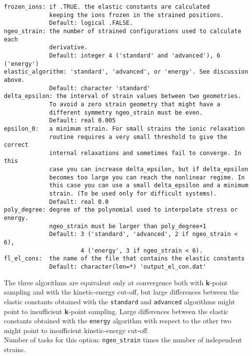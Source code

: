 \documentclass[12pt,a4paper]{article}
\begin{document}
\begin{verbatim}
frozen_ions: if .TRUE. the elastic constants are calculated 
             keeping the ions frozen in the strained positions. 
             Default: logical .FALSE.
ngeo_strain: the number of strained configurations used to calculate each
             derivative. 
             Default: integer 4 ('standard' and 'advanced'), 6 ('energy')
elastic_algorithm: 'standard', 'advanced', or 'energy'. See discussion above.
             Default: character 'standard' 
delta_epsilon: the interval of strain values between two geometries.
             To avoid a zero strain geometry that might have a
             different symmetry ngeo_strain must be even.
             Default: real 0.005
epsilon_0:   a minimum strain. For small strains the ionic relaxation 
             routine requires a very small threshold to give the correct 
             internal relaxations and sometimes fail to converge. In this 
             case you can increase delta_epsilon, but if delta_epsilon 
             becomes too large you can reach the nonlinear regime. In 
             this case you can use a small delta_epsilon and a minimum 
             strain. (To be used only for difficult systems).
             Default: real 0.0
poly_degree: degree of the polynomial used to interpolate stress or energy.
             ngeo_strain must be larger than poly_degree+1
             Default: 3 ('standard', 'advanced', 2 if ngeo_strain < 6), 
                      4 ('energy', 3 if ngeo_strain < 6).
fl_el_cons:  the name of the file that contains the elastic constants
             Default: character(len=*) 'output_el_con.dat'
\end{verbatim}
The three algorithms are equivalent only at convergence both with
{\bf k}-point sampling and with the kinetic-energy cut-off, but 
large differences between the elastic constants obtained with the 
\texttt{standard} and \texttt{advanced} algorithms might point to 
insufficient {\bf k}-point sampling. Large differences between the 
elastic constants obtained with the \texttt{energy} algorithm with respect 
to the other two might point to insufficient kinetic-energy cut-off. \\
Number of tasks for this option: \texttt{ngeo\_strain} times the number of
independent strains. \\
\end{document}
